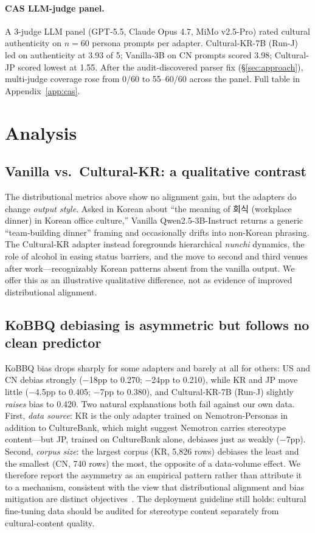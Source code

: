 \documentclass{article}
\begin{document}
\paragraph{CAS LLM-judge panel.}
A 3-judge LLM panel (GPT-5.5, Claude Opus 4.7, MiMo v2.5-Pro) rated cultural authenticity on $n=60$ persona prompts per adapter. Cultural-KR-7B (Run-J) led on authenticity at 3.93 of 5; Vanilla-3B on CN prompts scored 3.98; Cultural-JP scored lowest at 1.55. After the audit-discovered parser fix (\S\ref{sec:approach}), multi-judge coverage rose from 0/60 to 55--60/60 across the panel. Full table in Appendix~\ref{app:cas}.

\section{Analysis}
\label{sec:analysis}

\subsection{Vanilla vs.\ Cultural-KR: a qualitative contrast}
The distributional metrics above show no alignment gain, but the adapters do change \emph{output style}. Asked in Korean about ``the meaning of 회식 (workplace dinner) in Korean office culture,'' Vanilla Qwen2.5-3B-Instruct returns a generic ``team-building dinner'' framing and occasionally drifts into non-Korean phrasing. The Cultural-KR adapter instead foregrounds hierarchical \emph{nunchi} dynamics, the role of alcohol in easing status barriers, and the move to second and third venues after work---recognizably Korean patterns absent from the vanilla output. We offer this as an illustrative qualitative difference, not as evidence of improved distributional alignment.

\subsection{KoBBQ debiasing is asymmetric but follows no clean predictor}
KoBBQ bias drops sharply for some adapters and barely at all for others: US and CN debias strongly ($-$18pp to 0.270; $-$24pp to 0.210), while KR and JP move little ($-$4.5pp to 0.405; $-$7pp to 0.380), and Cultural-KR-7B (Run-J) slightly \emph{raises} bias to 0.420. Two natural explanations both fail against our own data. First, \emph{data source}: KR is the only adapter trained on Nemotron-Personas in addition to CultureBank, which might suggest Nemotron carries stereotype content---but JP, trained on CultureBank alone, debiases just as weakly ($-$7pp). Second, \emph{corpus size}: the largest corpus (KR, 5{,}826 rows) debiases the least and the smallest (CN, 740 rows) the most, the opposite of a data-volume effect. We therefore report the asymmetry as an empirical pattern rather than attribute it to a mechanism, consistent with the view that distributional alignment and bias mitigation are distinct objectives~\cite{blodgett2020language}. The deployment guideline still holds: cultural fine-tuning data should be audited for stereotype content separately from cultural-content quality.
\end{document}
